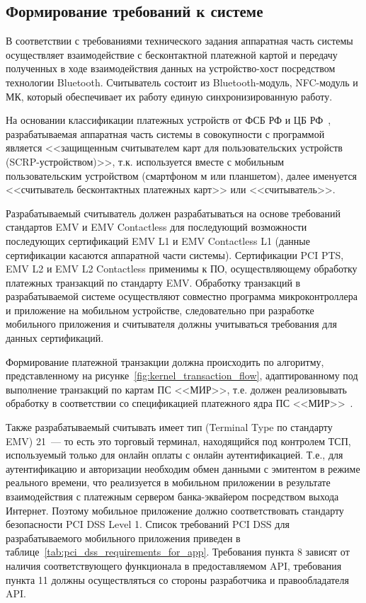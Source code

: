 

\subsection{Формирование требований к системе}

В соответствии с требованиями технического задания аппаратная часть системы осуществляет взаимодействие с бесконтактной платежной картой и передачу полученных в ходе взаимодействия данных на устройство-хост посредством технологии Bluetooth.
Считыватель состоит из Bluetooth-модуль, NFC-модуль и МК, который обеспечивает их работу единую синхронизированную работу.

На основании классификации платежных устройств от ФСБ РФ и ЦБ РФ~\cite{cbr_requirements}, разрабатываемая аппаратная часть системы в совокупности с программой является <<защищенным считывателем карт для пользовательских устройств (SCRP-устройством)>>, т.к. используется вместе с мобильным пользовательским устройством (смартфоном м или планшетом), далее именуется <<считыватель бесконтактных платежных карт>> или <<считыватель>>.

Разрабатываемый считыватель должен разрабатываться на основе требований стандартов EMV и EMV Contactless для последующий возможности последующих сертификаций EMV L1 и EMV Contactless L1 (данные сертификации касаются аппаратной части системы).
Сертификации PCI PTS, EMV L2 и EMV L2 Contactless применимы к ПО, осуществляющему обработку платежных транзакций по стандарту EMV.
Обработку транзакций в разрабатываемой системе осуществляют совместно программа микроконтроллера и приложение на мобильном устройстве, следовательно при разработке мобильного приложения и считывателя должны учитываться требования для данных сертификаций.

Формирование платежной транзакции должна происходить по алгоритму, представленному на рисунке~\ref{fig:kernel_transaction_flow}, адаптированному под выполнение транзакций по картам ПС <<МИР>>, т.е. должен реализовывать обработку в соответствии со спецификацией платежного ядра ПС <<МИР>>~\cite{book_mir}.

Также разрабатываемый считывать имеет тип (Terminal Type по стандарту EMV) 21~--- то есть это торговый терминал, находящийся под контролем ТСП, используемый только для онлайн оплаты с онлайн аутентификацией.
Т.е., для аутентификацию и авторизации необходим обмен данными с эмитентом в режиме реального времени, что реализуется в мобильном приложении  в результате взаимодействия с платежным сервером банка-эквайером посредством выхода Интернет.
Поэтому мобильное приложение должно соответствовать стандарту безопасности PCI DSS Level 1.
Список требований PCI DSS для разрабатываемого мобильного приложения приведен в таблице~\ref{tab:pci_dss_requirements_for_app}.
Требования пункта 8 зависят от наличия соответствующего функционала в предоставляемом API, требования пункта 11 должны осуществляться со стороны разработчика и правообладателя API.


